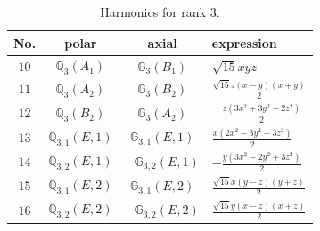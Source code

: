 \documentclass[fleqn,8pt,landscape]{jsarticle}
\begin{document}
\begin{table}[ht!]
\begin{center}
\caption{Harmonics for rank 3.}
\renewcommand{\arraystretch}{1.3}
\begin{tabular}{cccl} \hline \hline
No. & polar & axial & expression \\ \hline
$ 10 $ & $ \mathbb{Q}_{3}(A_{1}) $ & $ \mathbb{G}_{3}(B_{1}) $ & $ \sqrt{15} x y z $ \\
$ 11 $ & $ \mathbb{Q}_{3}(A_{2}) $ & $ \mathbb{G}_{3}(B_{2}) $ & $ \frac{\sqrt{15} z \left(x - y\right) \left(x + y\right)}{2} $ \\
$ 12 $ & $ \mathbb{Q}_{3}(B_{2}) $ & $ \mathbb{G}_{3}(A_{2}) $ & $ - \frac{z \left(3 x^{2} + 3 y^{2} - 2 z^{2}\right)}{2} $ \\
$ 13 $ & $ \mathbb{Q}_{3,1}(E,1) $ & $ \mathbb{G}_{3,1}(E,1) $ & $ \frac{x \left(2 x^{2} - 3 y^{2} - 3 z^{2}\right)}{2} $ \\
$ 14 $ & $ \mathbb{Q}_{3,2}(E,1) $ & $ -\mathbb{G}_{3,2}(E,1) $ & $ - \frac{y \left(3 x^{2} - 2 y^{2} + 3 z^{2}\right)}{2} $ \\
$ 15 $ & $ \mathbb{Q}_{3,1}(E,2) $ & $ \mathbb{G}_{3,1}(E,2) $ & $ \frac{\sqrt{15} x \left(y - z\right) \left(y + z\right)}{2} $ \\
$ 16 $ & $ \mathbb{Q}_{3,2}(E,2) $ & $ -\mathbb{G}_{3,2}(E,2) $ & $ \frac{\sqrt{15} y \left(x - z\right) \left(x + z\right)}{2} $ \\
 \hline \hline
\end{tabular}
\end{center}
\end{table}
\end{document}
